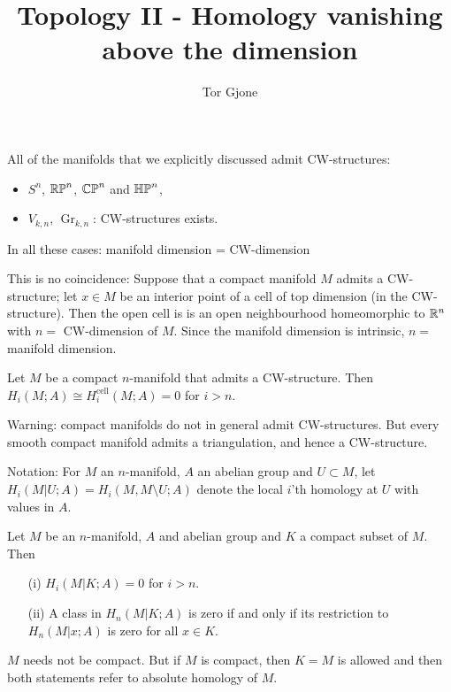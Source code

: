 \documentclass[a4paper,11pt,english]{article}
\title{\textbf{Topology II - Homology vanishing above the dimension}}
\author{Tor Gjone}
\DeclareMathOperator{\Gr}{Gr}
\begin{document}
\mmaketitle


All of the manifolds that we explicitly discussed admit CW-structures:

\begin{itemize}
\item $S^n$, $\mathbb{RP}^n$, $\mathbb{CP}^n$ and $\mathbb{HP}^n$,
\item $V_{k,n}$, $\Gr_{k,n}$: CW-structures exists.
\end{itemize}

In all these cases: manifold dimension = CW-dimension

This is no coincidence: Suppose that a compact manifold $M$ admits a
CW-structure; let $x\in M$ be an interior point of a cell of top dimension 
(in the CW-structure). Then the open cell is is an open neighbourhood
homeomorphic to $\mathbb{R}^n$ with $n = $ CW-dimension of $M$. Since the manifold
dimension is intrinsic, $n =$ manifold dimension.

\begin{corol}
Let $M$ be a compact $n$-manifold that admits a CW-structure. Then
$H_i(M; A) \cong H_i^{\text{cell}}(M;A) = 0$ for $i > n$.
\end{corol}

Warning: compact manifolds do not in general admit CW-structures. But every
smooth compact manifold admits a triangulation, and hence a CW-structure.

Notation: For $M$ an $n$-manifold, $A$ an abelian group and $U \subset M$, let $H_i(M|U; A) =
H_i(M, M \setminus U; A)$ denote the local $i$'th homology at $U$ with values in $A$.

\begin{thrm}
Let $M$ be an $n$-manifold, $A$ and abelian group and $K$ a compact subset of
$M$. Then
\begin{enumerate}
\item[(i)] $H_i(M|K; A) = 0$ for $i > n$.
\item[(ii)] A class in $H_n(M|K; A)$ is zero if and only if its
restriction to $H_n(M|x; A)$ is zero for all $x \in K$.
\end{enumerate}
\end{thrm}

\begin{note}
$M$ needs not be compact. But if $M$ is compact, then $K = M$ is allowed and
then both statements refer to absolute homology of $M$.
\end{note}
\end{document}
